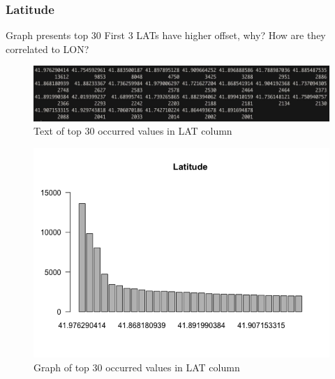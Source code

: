 \newpage
\subsubsection{Latitude}
Graph presents top 30
First 3 LATs have higher offset, why? How are they correlated to LON?
\begin{figure}[H]
\includegraphics[scale=0.4]{images/EDA/LAT.jpg}
\centering
\caption{Text of top 30 occurred values in LAT column}
\end{figure}
\begin{figure}[H]
\includegraphics[scale=0.7]{images/EDA/LAT.png}
\centering
\caption{Graph of top 30 occurred values in LAT column}
\end{figure}
